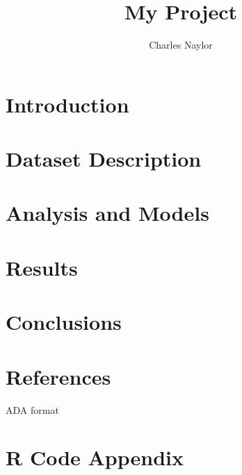 \documentclass{article}
\title{My Project}
\author{Charles Naylor}
\begin{document}
\maketitle
\tableofcontents
\section{Introduction}
\section{Dataset Description}
\section{Analysis and Models}
\section{Results}
\section{Conclusions}
\section{References}
ADA format
\section{R Code Appendix}
\end{document}
